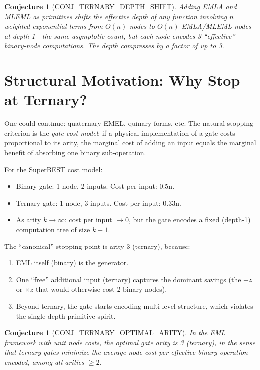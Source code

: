\documentclass[11pt]{article}
\newtheorem{conjecture}[theorem]{Conjecture}
\begin{document}
\begin{conjecture}[CONJ\_TERNARY\_DEPTH\_SHIFT]
Adding EMLA and MLEML as primitives shifts the effective depth of any function
involving $n$ weighted exponential terms from $O(n)$ nodes to $O(n)$ EMLA/MLEML
nodes at depth 1---the same asymptotic count, but each node encodes 3 ``effective''
binary-node computations. The depth \emph{compresses} by a factor of up to 3.
\end{conjecture}

\section{Structural Motivation: Why Stop at Ternary?}
\label{sec:why-stop}

One could continue: quaternary EMEL, quinary forms, etc. The natural stopping
criterion is the \emph{gate cost model}: if a physical implementation of a
gate costs proportional to its arity, the marginal cost of adding an input
equals the marginal benefit of absorbing one binary sub-operation.

For the SuperBEST cost model:
\begin{itemize}
  \item Binary gate: 1 node, 2 inputs. Cost per input: 0.5n.
  \item Ternary gate: 1 node, 3 inputs. Cost per input: 0.33n.
  \item As arity $k \to \infty$: cost per input $\to 0$, but the gate encodes
        a fixed (depth-1) computation tree of size $k-1$.
\end{itemize}

The ``canonical'' stopping point is arity-3 (ternary), because:
\begin{enumerate}
  \item EML itself (binary) is the generator.
  \item One ``free'' additional input (ternary) captures the dominant savings
        (the $+z$ or $\times z$ that would otherwise cost 2 binary nodes).
  \item Beyond ternary, the gate starts encoding multi-level structure,
        which violates the single-depth primitive spirit.
\end{enumerate}

\begin{conjecture}[CONJ\_TERNARY\_OPTIMAL\_ARITY]
In the EML framework with unit node costs, the optimal gate arity is 3
(ternary), in the sense that ternary gates minimize the average node cost
per effective binary-operation encoded, among all arities $\geq 2$.
\end{conjecture}
\end{document}
